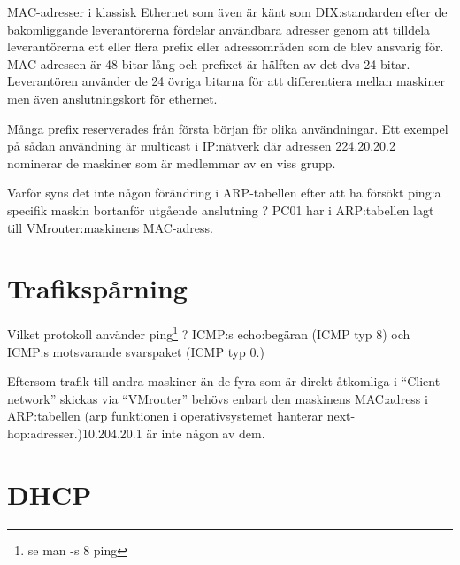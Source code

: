 \documentclass[swedish,11pt,a4paper]{article}
\begin{document}


    MAC-adresser i klassisk Ethernet som även är känt som DIX:standarden efter
    de bakomliggande leverantörerna fördelar användbara adresser genom att tilldela
    leverantörerna ett eller flera prefix eller adressområden som de blev ansvarig för. MAC-adressen är 48 bitar lång
    och prefixet är hälften av det dvs 24 bitar. Leverantören använder
    de 24 övriga bitarna för att differentiera mellan maskiner men även anslutningskort för ethernet.

    Många prefix reserverades från första början för olika användningar. Ett exempel på
    sådan användning är multicast i IP:nätverk där adressen 224.20.20.2 nominerar
    de maskiner som är medlemmar av en viss grupp.

    Varför syns det inte någon förändring i ARP-tabellen efter att
    ha försökt ping:a specifik maskin bortanför utgående anslutning ?
    PC01 har i ARP:tabellen lagt till VMrouter:maskinens MAC-adress.

    \section{Trafikspårning}
    \label{sec:wireshark_usage}

    Vilket protokoll använder ping\footnote{se man -s 8 ping} ? ICMP:s echo:begäran (ICMP typ 8) och ICMP:s motsvarande svarspaket (ICMP typ 0.)

    Eftersom trafik till andra maskiner än de fyra som är direkt åtkomliga i ``Client network'' skickas via
    ``VMrouter'' behövs enbart den maskinens MAC:adress i ARP:tabellen (arp funktionen i operativsystemet hanterar
    next-hop:adresser.)\@10.204.20.1 är inte någon av dem.

    \section{DHCP}
    \label{sec:dhcp_konf}
\end{document}
